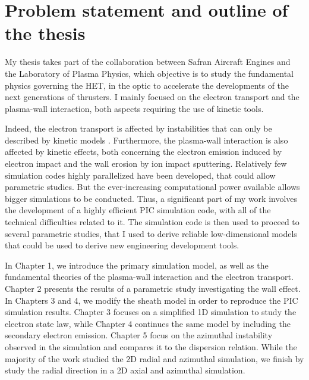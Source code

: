 
\section*{Problem statement and outline of the thesis}
\label{sec-problematic}

My thesis takes part of the collaboration between Safran Aircraft Engines and the Laboratory of Plasma Physics, which objective is to study the fundamental physics governing the \ac{HET}, in the optic to accelerate the developments of the next generations of thrusters.
I mainly focused on the electron transport and the plasma-wall interaction,
both aspects requiring the use of kinetic tools.

Indeed, the electron transport is affected by instabilities that can only be described by kinetic models \citep{adam2008a,lafleur2016a}.
Furthermore, the plasma-wall interaction is also affected by kinetic effects, both concerning the electron emission induced by electron impact \citep{barral2003a,raitses2011,sydorenko2006} and the wall erosion by ion impact sputtering.
Relatively few simulation codes highly parallelized have been developed, that could allow parametric studies.
But the ever-increasing computational power available allows bigger simulations to be conducted.
Thus, a significant part of my work involves the development of a highly efficient \ac{PIC} simulation code, with all of the technical difficulties related to it.
The simulation code is then used to proceed to several parametric studies, that I used to derive reliable low-dimensional models that could be used to derive new engineering development tools.


\vspace{1em}
In Chapter 1, we introduce the primary simulation model, as well as the fundamental theories of the plasma-wall interaction and the electron transport.
Chapter 2 presents the results of a parametric study investigating the wall effect.
In Chapters 3 and 4, we modify the sheath model in order to reproduce the \ac{PIC} simulation results.
Chapter 3 focuses on a simplified \ac{1D} simulation to study the electron state law, while Chapter 4 continues the same model by including the secondary electron emission.
Chapter 5 focus on the azimuthal instability observed in the simulation and compares it to the dispersion relation.
While the majority of the work studied the \ac{2D} radial and azimuthal simulation, we finish by study the radial direction in a \ac{2D} axial and azimuthal simulation.